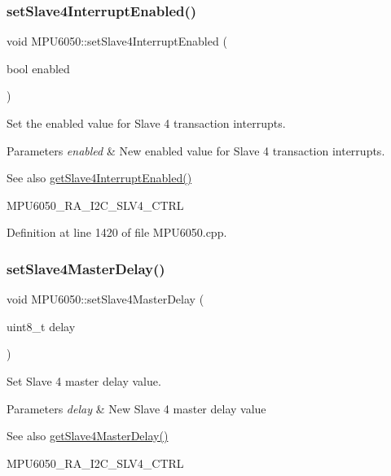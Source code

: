 \subsubsection{\texorpdfstring{setSlave4InterruptEnabled()}{setSlave4InterruptEnabled()}}
{\footnotesize\ttfamily void M\+P\+U6050\+::set\+Slave4\+Interrupt\+Enabled (\begin{DoxyParamCaption}\item[{bool}]{enabled }\end{DoxyParamCaption})}



Set the enabled value for Slave 4 transaction interrupts. 


\begin{DoxyParams}{Parameters}
{\em enabled} & New enabled value for Slave 4 transaction interrupts. \\
\hline
\end{DoxyParams}
\begin{DoxySeeAlso}{See also}
\mbox{\hyperlink{classMPU6050_a051549bcfa2eeb848c8557fc3efe74da}{get\+Slave4\+Interrupt\+Enabled()}} 

M\+P\+U6050\+\_\+\+R\+A\+\_\+\+I2\+C\+\_\+\+S\+L\+V4\+\_\+\+C\+T\+RL 
\end{DoxySeeAlso}


Definition at line 1420 of file M\+P\+U6050.\+cpp.

\mbox{\label{classMPU6050_ac154934a43c599cdc564fb29c22c45eb}} 
\subsubsection{\texorpdfstring{setSlave4MasterDelay()}{setSlave4MasterDelay()}}
{\footnotesize\ttfamily void M\+P\+U6050\+::set\+Slave4\+Master\+Delay (\begin{DoxyParamCaption}\item[{uint8\+\_\+t}]{delay }\end{DoxyParamCaption})}



Set Slave 4 master delay value. 


\begin{DoxyParams}{Parameters}
{\em delay} & New Slave 4 master delay value \\
\hline
\end{DoxyParams}
\begin{DoxySeeAlso}{See also}
\mbox{\hyperlink{classMPU6050_a9a4585b3c9e61478db198011107a56a9}{get\+Slave4\+Master\+Delay()}} 

M\+P\+U6050\+\_\+\+R\+A\+\_\+\+I2\+C\+\_\+\+S\+L\+V4\+\_\+\+C\+T\+RL 
\end{DoxySeeAlso}


